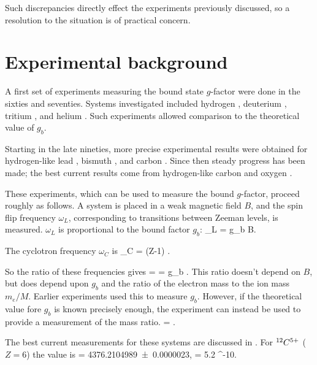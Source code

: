 Such discrepancies directly effect the experiments previously discussed, so a resolution to the situation is of practical concern.





\section{Experimental background}
A first set of experiments measuring the bound state $g$-factor were done in the sixties and seventies.  Systems investigated included hydrogen \cite{PhysRev.139.A19,PhysRevLett.39.602,PhysRevA.5.83}, deuterium \cite{PhysRevLett.28.1159}, tritium \cite{PhysRevA.9.1543}, and helium \cite{PhysRevLett.45.250}.  Such experiments allowed comparison to the theoretical value of $g_b$.

Starting in the late nineties, more precise experimental results were obtained for hydrogen-like lead \cite{PhysRevLett.81.4824}, bismuth \cite{GSI:1999}, and carbon \cite{PhysRevLett.85.5308}.  Since then steady progress has been made; the best current results come from hydrogen-like carbon \cite{PhysRevLett.85.5308,springerlink:10.1140/epjd/e2003-00012-2} and oxygen \cite{Verdu:November2002:1208-6045:1233,PhysRevLett.92.093002}.


These experiments, which can be used to measure the bound $g$-factor, proceed roughly as follows.  A system is placed in a weak magnetic field $B$, and the spin flip frequency $\omega_L$, corresponding to transitions between Zeeman levels, is measured.   $\omega_L$ is proportional to the bound factor $g_b$:
\beq
	\omega_L = g_b  B.
\eeq

The cyclotron frequency $\omega_C$ is
\beq
	\omega_C = (Z-1) .
\eeq

So the ratio of these frequencies gives
\beq
	 =  = 
	g_b  .
\eeq
This ratio doesn't depend on $B$, but does depend upon $g_b$ and the ratio of the electron mass to the ion mass $m_e/M$.  Earlier experiments used this to measure $g_b$.  However, if the theoretical value fore $g_b$ is known precisely enough, the experiment can instead be used to provide a measurement of the mass ratio.  
\beq
	 =  .
\eeq


The best current measurements for these systems are discussed in \cite{2006IJMSp.251..152W}.  For $^{12}C^{5+}$ ($Z=6$) the value is
\beq
	  = \num{4376.2104989(23)},	\hspace{3em} 	\delta= 5.2 ^{-10}.
\eeq

